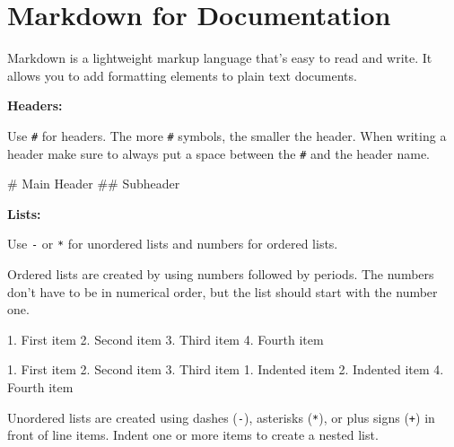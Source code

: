 \documentclass[
  letterpaper,
  DIV=11,
  numbers=noendperiod]{scrreprt}
\newenvironment{Shaded}{}{}
\newcommand{\FunctionTok}[1]{\textcolor[rgb]{0.44,0.26,0.76}{#1}}
\newcommand{\NormalTok}[1]{\textcolor[rgb]{0.14,0.16,0.18}{#1}}
\newcommand{\SpecialStringTok}[1]{\textcolor[rgb]{0.01,0.18,0.38}{#1}}
\begin{document}
\section{Markdown for Documentation}\label{markdown-for-documentation}

Markdown is a lightweight markup language that's easy to read and write.
It allows you to add formatting elements to plain text documents.

\textbf{Headers:}

Use \texttt{\#} for headers. The more \texttt{\#} symbols, the smaller
the header. When writing a header make sure to always put a space
between the \texttt{\#} and the header name.

\begin{Shaded}
\begin{Highlighting}[]
\FunctionTok{\# Main Header}
\FunctionTok{\#\# Subheader}
\end{Highlighting}
\end{Shaded}

\textbf{Lists:}

Use \texttt{-} or \texttt{*} for unordered lists and numbers for ordered
lists.

Ordered lists are created by using numbers followed by periods. The
numbers don't have to be in numerical order, but the list should start
with the number one.

\begin{Shaded}
\begin{Highlighting}[]
\SpecialStringTok{1. }\NormalTok{First item}
\SpecialStringTok{2. }\NormalTok{Second item}
\SpecialStringTok{3. }\NormalTok{Third item}
\SpecialStringTok{4. }\NormalTok{Fourth item }
\end{Highlighting}
\end{Shaded}

\begin{Shaded}
\begin{Highlighting}[]
\SpecialStringTok{1. }\NormalTok{First item}
\SpecialStringTok{2. }\NormalTok{Second item}
\SpecialStringTok{3. }\NormalTok{Third item}
\SpecialStringTok{    1. }\NormalTok{Indented item}
\SpecialStringTok{    2. }\NormalTok{Indented item}
\SpecialStringTok{4. }\NormalTok{Fourth item }
\end{Highlighting}
\end{Shaded}

Unordered lists are created using dashes (\texttt{-}), asterisks
(\texttt{*}), or plus signs (\texttt{+}) in front of line items. Indent
one or more items to create a nested list.
\end{document}

